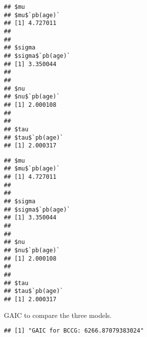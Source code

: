 \begin{Shaded}
\begin{Highlighting}[]
\end{Highlighting}
\end{Shaded}

\begin{verbatim}
## $mu
## $mu$`pb(age)`
## [1] 4.727011
## 
## 
## $sigma
## $sigma$`pb(age)`
## [1] 3.350044
## 
## 
## $nu
## $nu$`pb(age)`
## [1] 2.000108
## 
## 
## $tau
## $tau$`pb(age)`
## [1] 2.000317
\end{verbatim}

\begin{Shaded}
\begin{Highlighting}[]
\end{Highlighting}
\end{Shaded}

\begin{verbatim}
## $mu
## $mu$`pb(age)`
## [1] 4.727011
## 
## 
## $sigma
## $sigma$`pb(age)`
## [1] 3.350044
## 
## 
## $nu
## $nu$`pb(age)`
## [1] 2.000108
## 
## 
## $tau
## $tau$`pb(age)`
## [1] 2.000317
\end{verbatim}

GAIC to compare the three models.

\begin{Shaded}
\begin{Highlighting}[]
\OtherTok{\textless{}{-}} 
\OtherTok{\textless{}{-}} 
\OtherTok{\textless{}{-}} 

\NormalTok{(}\NormalTok{(}
\end{Highlighting}
\end{Shaded}

\begin{verbatim}
## [1] "GAIC for BCCG: 6266.87079383024"
\end{verbatim}

\begin{Shaded}
\begin{Highlighting}[]
\NormalTok{(}\NormalTok{(}
\end{Highlighting}
\end{Shaded}

